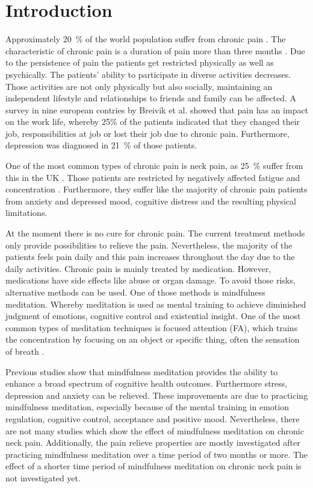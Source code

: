\section{Introduction}
Approximately 20~\% of the world population suffer from chronic pain \cite{Macfarlanea2016}. The characteristic of chronic pain is a duration of pain more than three months \cite{Mello2016}. Due to the persistence of pain the patients get restricted physically as well as psychically. The patients’ ability to participate in diverse activities decreases. Those activities are not only physically but also socially, maintaining an independent lifestyle and relationships to friends and family can be affected. A survey in nine european contries by Breivik et al. \cite{Breivik2006} showed that pain has an impact on the work life, whereby 25\% of the patients indicated that they changed their job, responsibilities at job or lost their job due to chronic pain. Furthermore, depression was diagnosed in 21~\% of those patients. \cite{Breivik2006} 

One of the most common types of chronic pain is neck pain, as 25~\% suffer from this in the UK \cite{Macfarlanea2016}. Those patients are restricted by negatively affected fatigue and concentration \cite{vanRanderaat2016}. Furthermore, they suffer like the majority of chronic pain patients from anxiety and depressed mood, cognitive distress and the resulting physical limitations. \cite{Gross2013} 

At the moment there is no cure for chronic pain. The current treatment methods only provide possibilities to relieve the pain. \cite{Pope2017,marcus2009} Nevertheless, the majority of the patients feels pain daily and this pain increases throughout the day due to the daily activities. \cite{Breivik2006} Chronic pain is mainly treated by medication. However, medications have side effects like abuse or organ damage. To avoid those risks, alternative methods can be used. One of those methods is mindfulness meditation. Whereby meditation is used as mental training to achieve diminished judgment of emotions, cognitive control and existential insight. \cite{marcus2009} One of the most common types of meditation techniques is focused attention (FA), which trains the concentration by focusing on an object or specific thing, often the sensation of breath \cite{Zeidan2016}. 

Previous studies show that mindfulness meditation provides the ability to enhance a broad spectrum of cognitive health outcomes. Furthermore stress, depression and anxiety can be relieved. These improvements are due to practicing mindfulness meditation, especially because of the mental training in emotion regulation, cognitive control, acceptance and positive mood. \cite{marcus2009,Zeidan2012} Nevertheless, there are not many studies which show the effect of mindfulness meditation on chronic neck pain. \cite{Macfarlanea2016} Additionally, the pain relieve properties are mostly investigated after practicing mindfulness meditation over a time period of two months or more. The effect of a shorter time period of mindfulness meditation on chronic neck pain is not investigated yet. 


